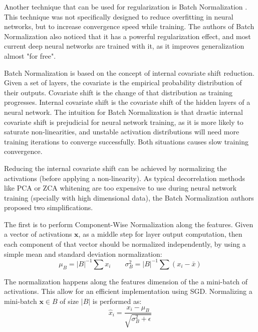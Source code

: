 Another technique that can be used for regularization is Batch Normalization \cite[1em]{ioffe2015batch}. This technique was not specifically designed to reduce overfitting in neural networks, but to increase convergence speed while training. The authors of Batch Normalization also noticed that it has a powerful regularization effect, and most current deep neural networks are trained with it, as it improves generalization almost "for free".

Batch Normalization  is based on the concept of internal covariate shift reduction. Given a set of layers, the covariate is the empirical probability distribution of their outputs. Covariate shift is the change of that distribution as training progresses. Internal covariate shift is the covariate shift of the hidden layers of a neural network. The intuition for Batch Normalization is that drastic internal covariate shift is prejudicial for neural network training, as it is more likely to saturate non-linearities, and unstable activation distributions will need more training iterations to converge successfully. Both situations causes slow training convergence.

Reducing the internal covariate shift can be achieved by normalizing the activations (before applying a non-linearity). As typical decorrelation methods like PCA or ZCA whitening are too expensive to use during neural network training (specially with high dimensional data), the Batch Normalization authors proposed two simplifications.

The first is to perform Component-Wise Normalization along the features. Given a vector of activations $\textbf{x}$, as a middle step for layer output computation, then each component of that vector should be normalized independently, by using a simple mean and standard deviation normalization: 
\vspace*{1em}
\begin{equation}
    \mu_{B} = |B|^{-1} \sum x_i \qquad \sigma^2_{B} = |B|^{-1} \sum (x_i - \bar{x})
\end{equation}

The normalization happens along the features dimension of the a mini-batch of activations. This allow for an efficient implementation using SGD. Normalizing a mini-batch $\textbf{x} \in B$ of size $|B|$ is performed as:
\vspace*{1em}
\begin{equation}
    \hat{x}_i = \frac{x_i - \mu_{B}}{\sqrt{\sigma^2_{B} + \epsilon}}
\end{equation}

